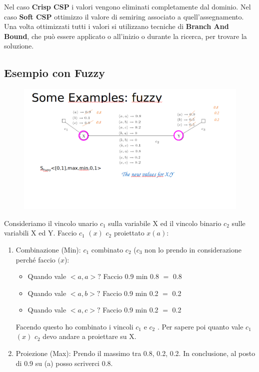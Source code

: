 Nel caso \textbf{Crisp CSP} i valori vengono eliminati completamente dal
dominio. Nel caso \textbf{Soft CSP} ottimizzo il valore di semiring associato a
quell'assegnamento. Una volta ottimizzati tutti i valori si utilizzano tecniche
di \textbf{Branch And Bound}, che può essere applicato o all'inizio o durante la
ricerca, per trovare la soluzione.

\subsection{Esempio con Fuzzy}
\begin{figure}[htp]
    \centering
    \includegraphics[width=15cm, keepaspectratio]{img/Cap5/ffuzzy2.png}
\end{figure}
Consideriamo il vincolo unario $c_1$ sulla variabile X ed il vincolo binario $c_2$
sulle variabili X ed Y. Faccio $c_1$ $(x)$ $c_2$ proiettato $x(a)$:
\begin{enumerate}
    \item Combinazione (Min): $c_1$ combinato $c_2$ ($c_3$ non lo prendo in
          considerazione perché faccio $(x$):
          \begin{itemize}
              \item Quando vale $< a, a >?$ Faccio 0.9 min 0.8 $=$ 0.8
              \item Quando vale $< a, b >?$ Faccio 0.9 min 0.2 $=$ 0.2
              \item Quando vale $< a, c >?$ Faccio 0.9 min 0.2 $=$ 0.2
          \end{itemize}
          Facendo questo ho combinato i vincoli $c_1$ e $c_2$ . Per sapere poi quanto
          vale $c_1$ $(x)$ $c_2$ devo andare a proiettare su X.
    \item Proiezione (Max): Prendo il massimo tra 0.8, 0.2, 0.2. In conclusione,
          al posto di 0.9 su (a) posso scriverci 0.8.
\end{enumerate}
